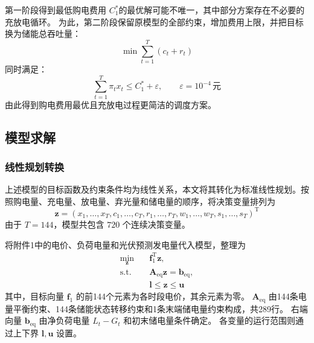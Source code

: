 第一阶段得到最低购电费用 \(C_1^*\)的最优解可能不唯一，其中部分方案存在不必要的充放电循环。
为此，第二阶段保留原模型的全部约束，增加费用上限，并把目标换为储能总吞吐量：
\begin{equation}
    \min \sum_{t=1}^{T}\left(c_t+r_t\right)
    \label{eq:q1_stage2}
\end{equation}
同时满足：
\begin{equation}
    \sum_{t=1}^{T}\pi_t x_t
    \leq C_1^*+\varepsilon,
    \qquad
    \varepsilon=10^{-4}\,\mathrm{元}
    \label{eq:q1_cost_tolerance}
\end{equation}
由此得到购电费用最优且充放电过程更简洁的调度方案。

\subsection{模型求解}

\subsubsection{线性规划转换}

上述模型的目标函数及约束条件均为线性关系，本文将其转化为标准线性规划。按照购电量、充电量、放电量、弃光量和储电量的顺序，将决策变量排列为
\begin{equation}
    \boldsymbol{z}
    =
    \left(
    x_1,\ldots,x_T,
    c_1,\ldots,c_T,
    r_1,\ldots,r_T,
    w_1,\ldots,w_T,
    s_1,\ldots,s_T
    \right)^{\mathrm T}
    \label{eq:q1_variable_vector}
\end{equation}
由于 \(T=144\)，模型共包含 \(720\) 个连续决策变量。

将附件1中的电价、负荷电量和光伏预测发电量代入模型，整理为
\begin{equation}
\begin{aligned}
    \min_{\boldsymbol z}\quad
    &\boldsymbol f_1^{\mathrm T}\boldsymbol z,\\
    \mathrm{s.t.}\quad
    &\boldsymbol A_{\mathrm{eq}}\boldsymbol z
    =\boldsymbol b_{\mathrm{eq}},\\
    &\boldsymbol l\leq\boldsymbol z\leq\boldsymbol u
\end{aligned}
\label{eq:q1_standard_lp}
\end{equation}
其中，目标向量 \(\boldsymbol f_1\) 的前144个元素为各时段电价，其余元素为零。
\(\boldsymbol A_{\mathrm{eq}}\) 由144条电量平衡约束、144条储能状态转移约束和1条末端储电量约束构成，共289行。
右端向量 \(\boldsymbol b_{\mathrm{eq}}\) 由净负荷电量 \(L_t-G_t\) 和初末储电量条件确定。
各变量的运行范围则通过上下界 \(\boldsymbol l,\boldsymbol u\) 设置。

